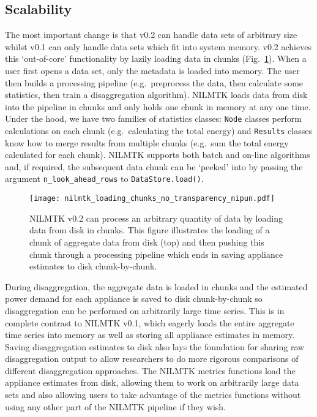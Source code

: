 \documentclass[10pt,abstract]{sensys-proc}
\begin{document}
\subsection{Scalability}
The most important change is that v0.2 can handle data sets of arbitrary size whilst v0.1 can only handle data sets which fit into system memory.  v0.2 achieves this `out-of-core' functionality by lazily loading data in chunks (Fig.~\ref{fig:pipeline}).  When a user first opens a data set, only the metadata is loaded into memory.  The user then builds a processing pipeline (e.g.\ preprocess the data, then calculate some statistics, then train a disaggregation algorithm).  NILMTK loads data from disk into the pipeline in chunks and only holds one chunk in memory at any one time.  Under the hood, we have two families of statistics classes: \texttt{Node} classes perform calculations on each chunk (e.g.\ calculating the total energy) and \texttt{Results} classes know how to merge results from multiple chunks (e.g.\ sum the total energy calculated for each chunk).  NILMTK supports both batch and on-line algorithms and, if required, the subsequent data chunk can be `peeked' into by passing the argument \texttt{n\_look\_ahead\_rows} to \texttt{DataStore.load()}.

\begin{figure}
\vspace{-6pt}
\centering 
\texttt{[image: nilmtk\_loading\_chunks\_no\_transparency\_nipun.pdf]}
\caption{\small{NILMTK v0.2 can process an arbitrary quantity of data by loading data from disk in chunks.  This figure illustrates the loading of a chunk of aggregate data from disk (top) and then pushing this chunk through a processing pipeline which ends in saving appliance estimates to disk chunk-by-chunk.}}
\label{fig:pipeline}
\end{figure}

During disaggregation, the aggregate data is loaded in chunks and the estimated power demand for each appliance is saved to disk chunk-by-chunk so disaggregation can be performed on arbitrarily large time series. This is in complete contrast to NILMTK v0.1, which eagerly loads the entire aggregate time series into memory as well as storing all appliance estimates in memory.  Saving disaggregation estimates to disk also lays the foundation for sharing raw disaggregation output to allow researchers to do more rigorous comparisons of different disaggregation approaches.  The NILMTK metrics functions load the appliance estimates from disk, allowing them to work on arbitrarily large data sets and also allowing users to take advantage of the metrics functions without using any other part of the NILMTK pipeline if they wish.
\end{document}
